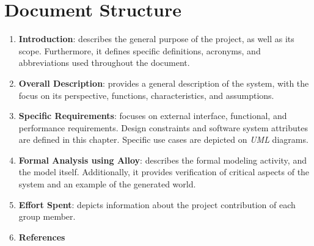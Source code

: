 \printbibliography[title={Reference Documents},keyword=intro, heading=subbibnumbered]

\section{Document Structure}

\begin{enumerate}
    \item \textbf{Introduction}: describes the general purpose of the project, as well as its scope. Furthermore, it defines specific definitions, acronyms, and abbreviations used throughout the document.
    \item \textbf{Overall Description}: provides a general description of the system, with the focus on its perspective, functions, characteristics, and assumptions.
    \item \textbf{Specific Requirements}: focuses on external interface, functional, and performance requirements. Design constraints and software system attributes are defined in this chapter. Specific use cases are depicted on \textit{UML} diagrams.
    \item \textbf{Formal Analysis using Alloy}: describes the formal modeling activity, and the model itself. Additionally, it provides verification of critical aspects of the system and an example of the generated world.
    \item \textbf{Effort Spent}: depicts information about the project contribution of each group member.
    \item \textbf{References}
\end{enumerate}
